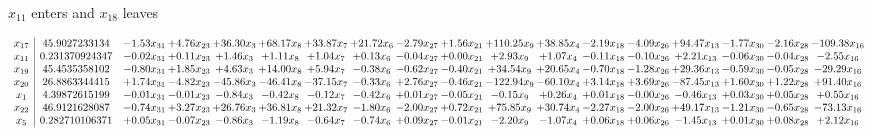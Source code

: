 \documentclass[9pt]{article}
\begin{document}
 $ x_{11} $ enters and $ x_{18} $ leaves 

 \[\begin{array}{c| c c@{\hskip 2pt} c@{\hskip 2pt} c@{\hskip 2pt} c@{\hskip 2pt} c@{\hskip 2pt} c@{\hskip 2pt} c@{\hskip 2pt} c@{\hskip 2pt} c@{\hskip 2pt} c@{\hskip 2pt} c@{\hskip 2pt} c@{\hskip 2pt} c@{\hskip 2pt} c@{\hskip 2pt} c@{\hskip 2pt} c@{\hskip 2pt} }
 x_{17}   &  45.9027233134 & -1.53 x_{31} & +  4.76 x_{23} & + 36.30 x_{3} & + 68.17 x_{8} & + 33.87 x_{7} & + 21.72 x_{6} & -2.79 x_{27} & +  1.56 x_{21} & + 110.25 x_{9} & + 38.85 x_{4} & -2.19 x_{18} & -4.09 x_{26} & + 94.47 x_{13} & -1.77 x_{30} & -2.16 x_{28} & -109.38 x_{16}\\
 x_{11}   &  0.231370924347 & -0.02 x_{31} & +  0.11 x_{23} & +  1.46 x_{3} & +  1.11 x_{8} & +  1.04 x_{7} & +  0.13 x_{6} & -0.04 x_{27} & +  0.00 x_{21} & +  2.93 x_{9} & +  1.07 x_{4} & -0.11 x_{18} & -0.10 x_{26} & +  2.21 x_{13} & -0.06 x_{30} & -0.04 x_{28} & -2.55 x_{16}\\
 x_{19}   &  45.4535358102 & -0.80 x_{31} & +  1.85 x_{23} & +  4.63 x_{3} & + 14.00 x_{8} & +  5.94 x_{7} & -0.38 x_{6} & -0.62 x_{27} & -0.40 x_{21} & + 34.54 x_{9} & + 20.65 x_{4} & -0.70 x_{18} & -1.28 x_{26} & + 29.36 x_{13} & -0.59 x_{30} & -0.05 x_{28} & -29.29 x_{16}\\
 x_{20}   &  26.8863344415 & +  1.74 x_{31} & -4.82 x_{23} & -45.86 x_{3} & -46.41 x_{8} & -37.15 x_{7} & -0.33 x_{6} & +  2.76 x_{27} & -0.46 x_{21} & -122.94 x_{9} & -60.10 x_{4} & +  3.14 x_{18} & +  3.69 x_{26} & -87.45 x_{13} & +  1.60 x_{30} & +  1.22 x_{28} & + 91.40 x_{16}\\
 x_{1}   &  4.39872615199 & -0.01 x_{31} & -0.01 x_{23} & -0.84 x_{3} & -0.42 x_{8} & -0.12 x_{7} & -0.42 x_{6} & +  0.01 x_{27} & -0.05 x_{21} & -0.15 x_{9} & +  0.26 x_{4} & +  0.01 x_{18} & -0.00 x_{26} & -0.46 x_{13} & +  0.03 x_{30} & +  0.05 x_{28} & +  0.55 x_{16}\\
 x_{22}   &  46.9121628087 & -0.74 x_{31} & +  3.27 x_{23} & + 26.76 x_{3} & + 36.81 x_{8} & + 21.32 x_{7} & -1.80 x_{6} & -2.00 x_{27} & +  0.72 x_{21} & + 75.85 x_{9} & + 30.74 x_{4} & -2.27 x_{18} & -2.00 x_{26} & + 49.17 x_{13} & -1.21 x_{30} & -0.65 x_{28} & -73.13 x_{16}\\
 x_{5}   &  0.282710106371 & +  0.05 x_{31} & -0.07 x_{23} & -0.86 x_{3} & -1.19 x_{8} & -0.64 x_{7} & -0.74 x_{6} & +  0.09 x_{27} & -0.01 x_{21} & -2.20 x_{9} & -1.07 x_{4} & +  0.06 x_{18} & +  0.06 x_{26} & -1.45 x_{13} & +  0.01 x_{30} & +  0.08 x_{28} & +  2.12 x_{16}\\

\end{array}\]
\end{document}

